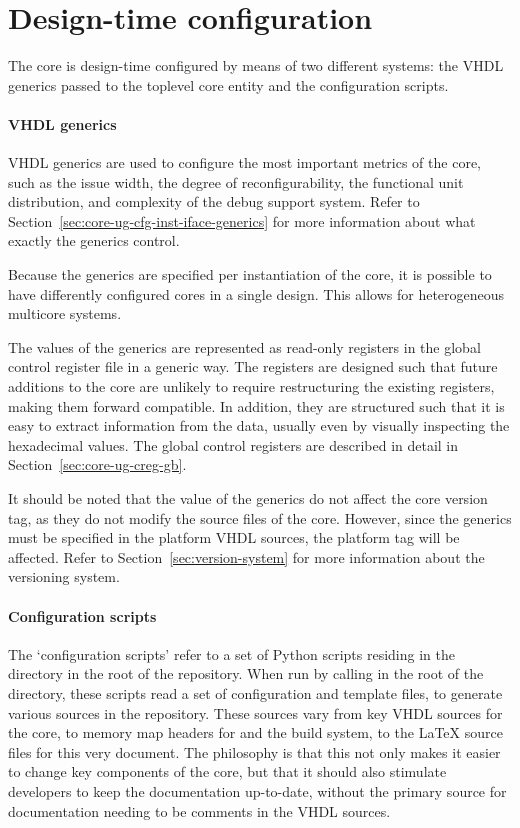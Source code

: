 
\clearpage
\section{Design-time configuration}
\label{sec:core-ug-cfg}

The \rvex{} core is design-time configured by means of two different systems:
the VHDL generics passed to the toplevel core entity and the configuration
scripts.

\paragraph*{VHDL generics} VHDL generics are used to configure the most 
important metrics of the core, such as the issue width, the degree of 
reconfigurability, the functional unit distribution, and complexity of the debug 
support system. Refer to Section~\ref{sec:core-ug-cfg-inst-iface-generics} for 
more information about what exactly the generics control.

Because the generics are specified per instantiation of the core, it is possible
to have differently configured \rvex{} cores in a single design. This allows for
heterogeneous multicore systems.

The values of the generics are represented as read-only registers in the global
control register file in a generic way. The registers are designed such that
future additions to the core are unlikely to require restructuring the existing
registers, making them forward compatible. In addition, they are structured such
that it is easy to extract information from the data, usually even by visually
inspecting the hexadecimal values. The global control registers are described in
detail in Section~\ref{sec:core-ug-creg-gb}.

It should be noted that the value of the generics do not affect the core version
tag, as they do not modify the source files of the core. However, since the
generics must be specified in the platform VHDL sources, the platform tag will
be affected. Refer to Section~\ref{sec:version-system} for more information
about the versioning system. 

\paragraph*{Configuration scripts} The `configuration scripts' refer to a set of 
Python scripts residing in the  directory in the root of the 
\rvex{} repository. When run by calling  in the root of the 
 directory, these scripts read a set of configuration and template 
files, to generate various sources in the repository. These sources vary from 
key VHDL sources for the \rvex{} core, to memory map headers for  and 
the build system, to the LaTeX source files for this very document. The 
philosophy is that this not only makes it easier to change key components of the 
core, but that it should also stimulate developers to keep the documentation 
up-to-date, without the primary source for documentation needing to be comments 
in the VHDL sources.


